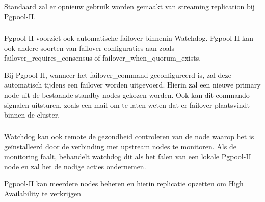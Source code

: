Standaard zal er opnieuw gebruik worden gemaakt van streaming replication bij Pgpool-II.

\subsubsection{}
\label{subsubsec:Failover}

Pgpool-II voorziet ook automatische failover binnenin Watchdog. Pgpool-II kan ook andere soorten van failover configuraties aan zoals failover\_requires\_consensus of \newline failover\_when\_quorum\_exists. 

Bij Pgpool-II, wanneer het failover\_command geconfigureerd is, zal deze automatisch tijdens een failover worden uitgevoerd. Hierin zal een nieuwe primary node uit de bestaande standby nodes gekozen worden. Ook kan dit commando signalen uitsturen, zoals een mail om te laten weten dat er failover plaatsvindt binnen de cluster.

\subsubsection{}
\label{subsubsec:Monitoring}

Watchdog kan ook remote de gezondheid controleren van de node waarop het is geïnstalleerd door de verbinding met upstream nodes te monitoren. Als de monitoring faalt, behandelt watchdog dit als het falen van een lokale Pgpool-II node en zal het de nodige acties ondernemen.

Pgpool-II kan meerdere nodes beheren en hierin replicatie opzetten om High Availability te verkrijgen

\subsection{}
\label{subsec:Should have}


\subsubsection{}
\label{subsubsec:Actieve ondersteuning in 2020-2021}

